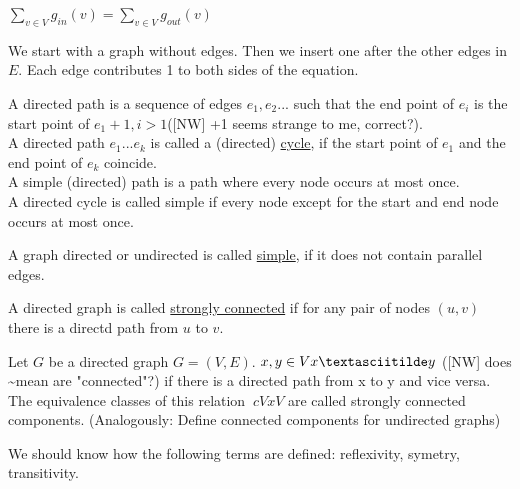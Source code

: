\begin{lemma}
    $\displaystyle\sum\limits_{v \in V} g_{in}(v) = \displaystyle\sum\limits_{v \in V} g_{out}(v)$
\end{lemma}

\begin{prooof}
    We start with a graph without edges. Then we insert one after the other edges in $E$. 
    Each edge contributes 1 to both sides of the equation.
\end{prooof}

\begin{definition}
    A directed path is a sequence of edges $e_{1},e_{2}...$ such that the end point of $e_{i}$ is the start point of
    $e_{1} +1, i > 1$([NW] +1 seems strange to me, correct?). \\[3mm]

    A directed path $e_{1}...e_{k}$ is called a (directed) \underline{cycle}, if the start point of $e_{1}$ and
    the end point of $e_{k}$ coincide. \\
    A simple (directed) path is a path where every node occurs at most once. \\
    A directed cycle is called simple if every node except for the start and end node occurs at most once.
\end{definition}

\begin{definition}
    A graph directed or undirected is called \underline{simple}, if it does not contain parallel edges.
\end{definition}

\begin{definition}
        A directed graph is called \underline{strongly connected} if for any pair of nodes $(u,v)$ 
        there is a directd path from $u$ to $v$.
\end{definition}

Let $G$ be a directed graph $G = (V,E)$. $x,y \in V x \textasciitilde y$ ([NW] does \textasciitilde mean are "connected"?)
if there is a directed path from x to y and vice versa. \\

The equivalence classes of this relation $~c VxV$ are called strongly connected components.
(Analogously: Define connected components for undirected graphs)

\begin{information}
    We should know how the following terms are defined: reflexivity, symetry, transitivity.
\end{information}

